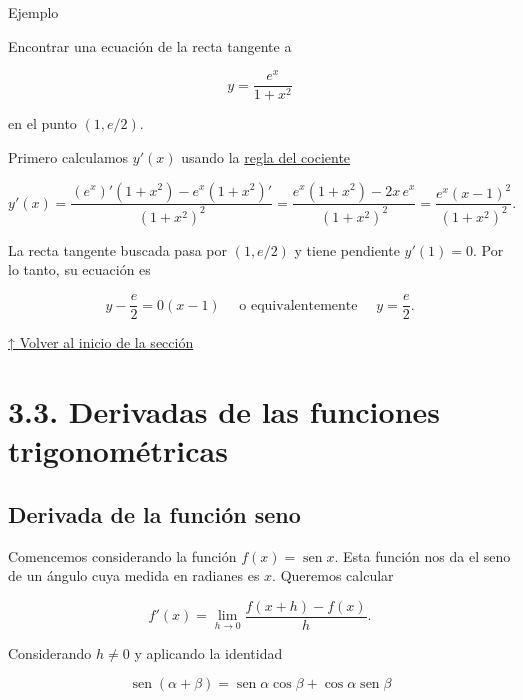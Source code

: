 \documentclass[
  letterpaper,
]{book}
\theoremstyle{plain}
\theoremstyle{remark}
\begin{document}
Ejemplo

Encontrar una ecuación de la recta tangente a

\[
\displaystyle y=\frac{e^x}{1+x^2}
\]

en el punto \((1,e/2)\).

\begin{tcolorbox}[enhanced jigsaw, opacityback=0, left=2mm, opacitybacktitle=0.6, toprule=.15mm, bottomrule=.15mm, colbacktitle=quarto-callout-tip-color!10!white, titlerule=0mm, bottomtitle=1mm, title=\textcolor{quarto-callout-tip-color}{\faLightbulb}\hspace{0.5em}{Solución}, toptitle=1mm, colframe=quarto-callout-tip-color-frame, colback=white, breakable, rightrule=.15mm, arc=.35mm, leftrule=.75mm, coltitle=black]

Primero calculamos \(y'(x)\) usando la
\hyperref[eq-regla-cociente]{regla del cociente}

\[
y'(x)=\frac{\left(e^x\right)'(1+x^2)-e^x(1+x^2)'}{(1+x^2)^2}=\frac{e^x(1+x^2)-2x\,e^x}{(1+x^2)^2}=\frac{e^x(x-1)^2}{(1+x^2)^2}.
\]

La recta tangente buscada pasa por \((1,e/2)\) y tiene pendiente
\(y'(1)=0\). Por lo tanto, su ecuación es

\[
y-\frac{e}{2}=0(x-1) \quad \text{ o equivalentemente } \quad y=\frac{e}{2}.
\]

\end{tcolorbox}

\hyperref[seccion_3.2]{↑ Volver al inicio de la sección}

\section{3.3. Derivadas de las funciones
trigonométricas}\label{seccion_3.3}

\subsection{Derivada de la función
seno}\label{derivada-de-la-funciuxf3n-seno}

Comencemos considerando la función \(f(x)=\operatorname{sen} x\). Esta
función nos da el seno de un ángulo cuya medida en radianes es \(x\).
Queremos calcular

\[
f'(x)=\lim_{h\to 0}\frac{f(x+h)-f(x)}{h}.
\]

Considerando \(h\neq 0\) y aplicando la identidad

\[
\operatorname{sen}(\alpha+\beta)=\operatorname{sen} \alpha\cos \beta+\cos\alpha \operatorname{sen} \beta 
\]
\end{document}
